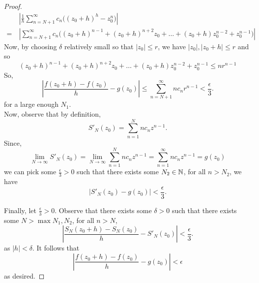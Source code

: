 \documentclass[11pt]{article}
\begin{document}
\begin{proof}
\begin{align*}
		&\>\left|\frac{1}{h} \sum^\infty_{n=N+1}c_n \big((z_0+h)^h
	-z_0^n\big)\right|\\ =&\>
	\left|\sum^{\infty}_{n=N+1}c_n\big((z_0+h)^{n-1} +
	(z_0+h)^{n+2}z_0+\dots+(z_0+h)z_0^{n-2}+z_0^{n-1}\big)\right|
\end{align*}
Now, by choosing $\delta$ relatively small so that $|z_0|\leq r $, we have
$|z_0|, |z_0+h| \leq r$ and so
\begin{equation*}
	(z_0+h)^{n-1}+(z_0+h)^{n+2}z_0+\dots+(z_0+h)z_0^{n-2}+z_0^{n-1}
	\leq nr^{n-1}
\end{equation*}
So,
\begin{equation*}
	\left|\frac{f(z_0+h)-f(z_0)}{h}-g(z_0)\right| \leq
	\sum^\infty_{n=N+1}nc_nr^{n-1} < \frac{\epsilon}{3}.
\end{equation*}
for a large enough $N_1$.\\

Now, observe that by definition,
\begin{equation*}
	S'_N(z_0) = \sum^N_{n=1} nc_nz^{n-1}.
\end{equation*}
Since,
\begin{equation*}
	\lim_{N\to\infty} S'_N(z_0)
	= \lim_{N\to\infty} \sum^N_{n=1} nc_nz^{n-1}
	= \sum^\infty_{n=1} nc_nz^{n-1}
	= g(z_0)
\end{equation*}
we can pick some $\frac{\epsilon}{3} >0$ such that there exists some
$N_2\in\mathbb{N}$, for all $n > N_2$, we have
\begin{equation*}
	|S'_N(z_0)-g(z_0)| < \frac{\epsilon}{3}.
\end{equation*}

Finally, let $\frac{\epsilon}{3} > 0$. Observe that there exists some
$\delta > 0$ such that there exists some $N > \max{N_1,N_2}$, for all $n >
N$,
\begin{equation*}
	\left|\frac{S_N(z_0+h)-S_N(z_0)}{h}-S'_N(z_0)\right| <
	\frac{\epsilon}{3}.
\end{equation*}
as $|h| < \delta$. It follows that
\begin{equation*}
	\left|\frac{f(z_0+h)-f(z_0)}{h}-g(z_0)\right| < \epsilon
\end{equation*}
as desired.
\end{proof}
\end{document}

